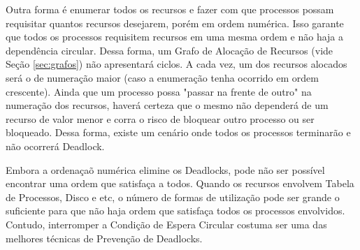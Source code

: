 	Outra forma é enumerar todos os recursos e fazer com que processos possam requisitar quantos recursos desejarem, porém em ordem numérica. Isso garante que todos os processos requisitem recursos em uma mesma ordem e não haja a dependência circular. Dessa forma, um Grafo de Alocação de Recursos (vide Seção \ref{sec:grafos}) não apresentará ciclos. A cada vez, um dos recursos alocados será o de numeração maior (caso a enumeração tenha ocorrido em ordem crescente). Ainda que um processo possa "passar na frente de outro" na numeração dos recursos, haverá certeza que o mesmo não dependerá de um recurso de valor menor e corra o risco de bloquear outro processo ou ser bloqueado. Dessa forma, existe um cenário onde todos os processos terminarão e não ocorrerá Deadlock.

	Embora a ordenaçaõ numérica elimine os Deadlocks, pode não ser possível encontrar uma ordem que satisfaça a todos. Quando os recursos envolvem Tabela de Processos, Disco e etc, o número de formas de utilização pode ser grande o suficiente para que não haja ordem que satisfaça todos os processos envolvidos. Contudo, interromper a Condição de Espera Circular costuma ser uma das melhores técnicas de Prevenção de Deadlocks.

	
	


